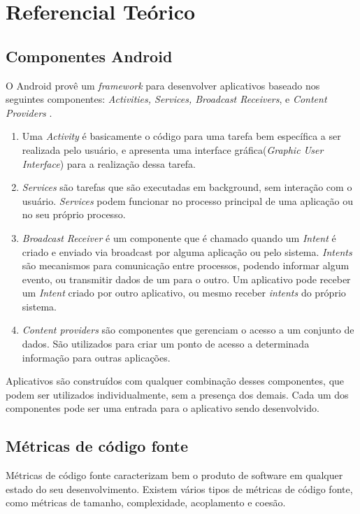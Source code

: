 \chapter{Referencial Teórico}
\label{cap:referencial_teorico}

\section{Componentes Android}
O Android provê um \textit{framework} para desenvolver aplicativos baseado nos seguintes componentes: \textit{Activities, Services, Broadcast Receivers}, e \textit{Content Providers} \cite{heuser2014}. 

\begin{enumerate}
\item Uma \textit{Activity} é basicamente o código para uma tarefa bem específica a ser realizada pelo usuário, e apresenta uma interface gráfica(\textit{Graphic User Interface}) para a realização dessa tarefa.
\item \textit{Services} são tarefas que são executadas em background, sem interação com o usuário. \textit{Services} podem funcionar no processo principal de uma aplicação ou no seu próprio processo.
\item \textit{Broadcast Receiver} é um componente que é chamado quando um \textit{Intent} é criado e enviado via broadcast por alguma aplicação ou pelo sistema. \textit{Intents} são mecanismos para comunicação entre processos, podendo informar algum evento, ou transmitir dados de um para o outro.
Um aplicativo pode receber um \textit{Intent} criado por outro aplicativo, ou mesmo receber \textit{intents} do próprio sistema.
\item \textit{Content providers} são componentes que gerenciam o acesso a um conjunto de dados. São utilizados para criar um ponto de acesso a determinada informação para outras aplicações.
\end{enumerate}

Aplicativos são construídos com qualquer combinação desses componentes, que podem ser utilizados individualmente, sem a presença dos demais. Cada um dos componentes pode ser uma entrada para o aplicativo sendo desenvolvido.

\section{Métricas de código fonte}
Métricas de código fonte caracterizam bem o produto de software em qualquer estado do seu desenvolvimento. Existem vários tipos de métricas de código fonte, como métricas de tamanho, complexidade, acoplamento e coesão.

